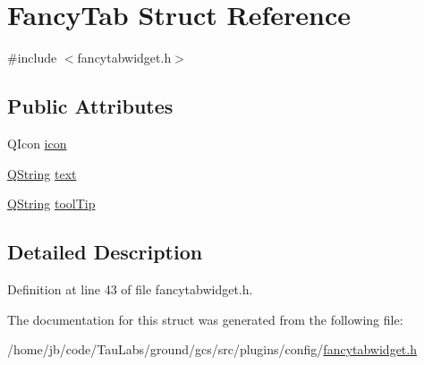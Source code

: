 \hypertarget{struct_fancy_tab}{\section{\-Fancy\-Tab \-Struct \-Reference}
\label{struct_fancy_tab}
}


{\ttfamily \#include $<$fancytabwidget.\-h$>$}

\subsection*{\-Public \-Attributes}
\begin{DoxyCompactItemize}
\item 
\-Q\-Icon \hyperlink{group___core_plugin_gae60277b0cf871bcdf36b505bc485e1d5}{icon}
\item 
\hyperlink{group___u_a_v_objects_plugin_gab9d252f49c333c94a72f97ce3105a32d}{\-Q\-String} \hyperlink{group___core_plugin_ga9e58434e197c41cc12428b0767b4e32f}{text}
\item 
\hyperlink{group___u_a_v_objects_plugin_gab9d252f49c333c94a72f97ce3105a32d}{\-Q\-String} \hyperlink{group___core_plugin_ga8512ccbf00fd40d53ba9d4e7f47c9f0b}{tool\-Tip}
\end{DoxyCompactItemize}


\subsection{\-Detailed \-Description}


\-Definition at line 43 of file fancytabwidget.\-h.



\-The documentation for this struct was generated from the following file\-:\begin{DoxyCompactItemize}
\item 
/home/jb/code/\-Tau\-Labs/ground/gcs/src/plugins/config/\hyperlink{config_2fancytabwidget_8h}{fancytabwidget.\-h}\end{DoxyCompactItemize}
